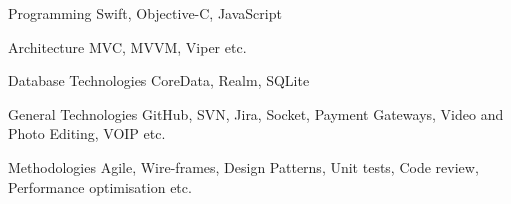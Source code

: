 


\begin{cvskills}


\cvskill
{Programming} %
{Swift, Objective-C, JavaScript} %


\cvskill
{Architecture} %
{MVC, MVVM, Viper etc.} %


\cvskill
{Database Technologies} %
{CoreData, Realm, SQLite} %


\cvskill
{General Technologies} %
{GitHub, SVN, Jira, Socket, Payment Gateways, Video and Photo Editing, VOIP etc.} %


\cvskill
{Methodologies} %
{Agile, Wire-frames, Design Patterns, Unit tests, Code review, Performance optimisation etc.} %


\end{cvskills}
